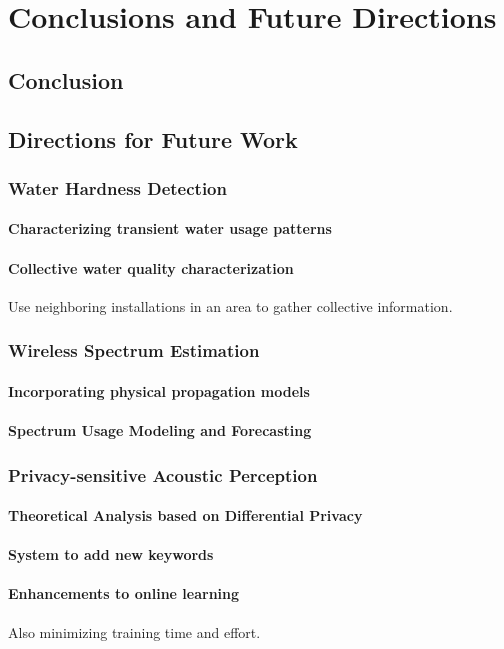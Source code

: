\chapter{Conclusions and Future Directions}


\section{Conclusion}



\section{Directions for Future Work}


\subsection{Water Hardness Detection}

\subsubsection{Characterizing transient water usage patterns}

\subsubsection{Collective water quality characterization}

Use neighboring installations in an area to gather collective information.




\subsection{Wireless Spectrum Estimation}

\subsubsection{Incorporating physical propagation models}

\subsubsection{Spectrum Usage Modeling and Forecasting}




\subsection{Privacy-sensitive Acoustic Perception}

\subsubsection{Theoretical Analysis based on Differential Privacy}

\subsubsection{System to add new keywords}

\subsubsection{Enhancements to online learning}

Also minimizing training time and effort.
